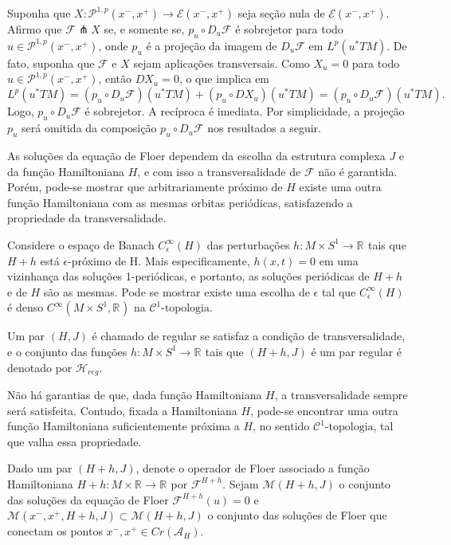 \documentclass[12pt]{book}
\newcommand{\aplicaoessuaves}[2]{C^{\infty}(#1, #2)}
\newcommand{\caminhosexponenciaisconectantes}[2]{\mathcal{P}^{1,p}(#1, #2)}
\newcommand{\caminhosexponenciaisconectantespadrao}{\caminhosexponenciaisconectantes{x^{-}}{x^{+}}}
\newcommand{\circulo}{S^{1}}
\newcommand{\cktopologia}[1]{\mathcal{C}^{#1}\text{-topologia}}
\newcommand{\diferencialfloerponto}[1]{D_{#1}\operadorFloer}
\newcommand{\energiafinitaM}{\mathcal{M}}
\newcommand{\energiafinitaMHamiltoniana}[1]{\energiafinitaM(#1, J)}
\newcommand{\energiafinitaMconectanteHamiltoniana}{\energiafinitaM(x^{-}, x^{+},H+h,J)}
\newcommand{\espacoLp}[1]{L^{p}(#1)}
\newcommand{\fibradocaminhosexponenciais}{\mathcal{E}(x^{-}, x^{+})}
\newcommand{\funcionalH}{\mathcal{A}_{H}}
\newcommand{\hamiltonianasRegulares}{\mathcal{H}_{reg}}
\newcommand{\operadorFloer}{\mathcal{F}}
\newcommand{\perturbacaoHamiltoniana}[1]{C^{\infty}_{\epsilon}(#1)}
\newcommand{\pontoscriticos}[1]{\textit{Cr}(#1)}
\newcommand{\pullbackfibradotangente}[2]{#1^{*}T#2}
\newcommand{\pullbackfibradotangenteM}[1]{\pullbackfibradotangente{#1}{M}}
\newcommand{\real}[1]{\mathbb{R}^{#1}}
\newcommand{\reta}{\real{}}
\begin{document}
	Suponha que $X:\caminhosexponenciaisconectantespadrao \to \fibradocaminhosexponenciais$ seja seção nula de $\fibradocaminhosexponenciais$. Afirmo que $\operadorFloer \pitchfork X$ se, e somente se, $p_{u}\circ\diferencialfloerponto{u}$ é sobrejetor para todo $u\in \caminhosexponenciaisconectantespadrao$, onde $p_{u}$ é a projeção da imagem de $\diferencialfloerponto{u}$ em $\espacoLp{\pullbackfibradotangenteM{u}}$. De fato, suponha que $\operadorFloer$ e $X$ sejam aplicações transversais. Como $X_{u} = 0$ para todo $u \in \caminhosexponenciaisconectantespadrao$, então $DX_{u} = 0$, o que implica em
	$$
	\espacoLp{\pullbackfibradotangenteM{u}} = (p_{u}\circ \diferencialfloerponto{u})(\pullbackfibradotangenteM{u}) + (p_{u}\circ DX_{u})(\pullbackfibradotangenteM{u}) = (p_{u}\circ \diferencialfloerponto{u})(\pullbackfibradotangenteM{u}).$$ 
	Logo, $p_{u}\circ\diferencialfloerponto{u}$ é sobrejetor. A recíproca é imediata. Por simplicidade, a projeção $p_{u}$ será omitida da composição $p_{u}\circ\diferencialfloerponto{u}$ nos resultados a seguir.
	
	As soluções da equação de Floer dependem da escolha da estrutura complexa $J$ e da função Hamiltoniana $H$, e com isso a transversalidade de $\operadorFloer$ não é garantida. Porém, pode-se mostrar que arbitrariamente próximo de $H$ existe uma outra função Hamiltoniana com as mesmas orbitas periódicas, satisfazendo a propriedade da transversalidade.
	
	Considere o espaço de Banach $\perturbacaoHamiltoniana{H}$ das perturbações 
	$h:M\times \circulo \to \reta$ tais que $H+h$ está $\epsilon$-próximo de H. Mais especificamente,  $h(x,t)=0$ em uma vizinhança das soluções 1-periódicas, e portanto, as soluções periódicas de $H+h$ e de $H$ são as mesmas. Pode se mostrar existe uma escolha de $\epsilon$ tal que $\perturbacaoHamiltoniana{H}$ é denso $\aplicaoessuaves{M\times \circulo}{\reta}$ na $\cktopologia{1}$.
	
	Um par $(H, J)$ é chamado de regular se satisfaz a condição de transversalidade, e o conjunto das funções $h:M\times \circulo \to \reta$ tais que $(H+h,J)$ é um par regular é denotado por $\hamiltonianasRegulares$.

	Não há garantias de que, dada função Hamiltoniana $H$, a transversalidade sempre será satisfeita. Contudo, fixada a Hamiltoniana $H$, pode-se encontrar uma outra função Hamiltoniana suficientemente próxima a $H$, no sentido $\cktopologia{1}$, tal que valha essa propriedade. 
	
	Dado um par $(H+h, J)$, denote o operador de Floer associado a função Hamiltoniana $H+h:M\times \reta \to \reta$ por $\operadorFloer^{H+h}$. Sejam $\energiafinitaMHamiltoniana{H+h}$ o conjunto das soluções da equação de Floer $\operadorFloer^{H+h}(u)=0$ e  $\energiafinitaMconectanteHamiltoniana \subset \energiafinitaMHamiltoniana{H+h}$ o conjunto das soluções de Floer que conectam os pontos $x^{-}, x^{+} \in \pontoscriticos{\funcionalH}$.
	
\end{document}

